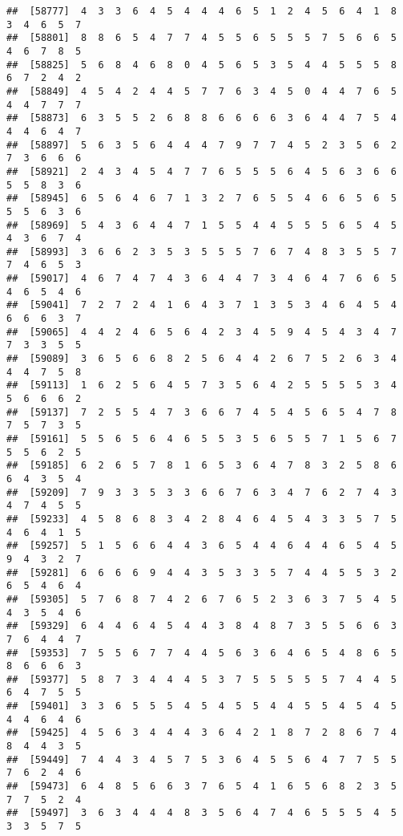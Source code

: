 \documentclass[
]{book}
\begin{document}
\begin{verbatim}
##  [58777]  4  3  3  6  4  5  4  4  4  6  5  1  2  4  5  6  4  1  8  3  4  6  5  7
##  [58801]  8  8  6  5  4  7  7  4  5  5  6  5  5  5  7  5  6  6  5  4  6  7  8  5
##  [58825]  5  6  8  4  6  8  0  4  5  6  5  3  5  4  4  5  5  5  8  6  7  2  4  2
##  [58849]  4  5  4  2  4  4  5  7  7  6  3  4  5  0  4  4  7  6  5  4  4  7  7  7
##  [58873]  6  3  5  5  2  6  8  8  6  6  6  6  3  6  4  4  7  5  4  4  4  6  4  7
##  [58897]  5  6  3  5  6  4  4  4  7  9  7  7  4  5  2  3  5  6  2  7  3  6  6  6
##  [58921]  2  4  3  4  5  4  7  7  6  5  5  5  6  4  5  6  3  6  6  5  5  8  3  6
##  [58945]  6  5  6  4  6  7  1  3  2  7  6  5  5  4  6  6  5  6  5  5  5  6  3  6
##  [58969]  5  4  3  6  4  4  7  1  5  5  4  4  5  5  5  6  5  4  5  4  3  6  7  4
##  [58993]  3  6  6  2  3  5  3  5  5  5  7  6  7  4  8  3  5  5  7  7  4  6  5  3
##  [59017]  4  6  7  4  7  4  3  6  4  4  7  3  4  6  4  7  6  6  5  4  6  5  4  6
##  [59041]  7  2  7  2  4  1  6  4  3  7  1  3  5  3  4  6  4  5  4  6  6  6  3  7
##  [59065]  4  4  2  4  6  5  6  4  2  3  4  5  9  4  5  4  3  4  7  7  3  3  5  5
##  [59089]  3  6  5  6  6  8  2  5  6  4  4  2  6  7  5  2  6  3  4  4  4  7  5  8
##  [59113]  1  6  2  5  6  4  5  7  3  5  6  4  2  5  5  5  5  3  4  5  6  6  6  2
##  [59137]  7  2  5  5  4  7  3  6  6  7  4  5  4  5  6  5  4  7  8  7  5  7  3  5
##  [59161]  5  5  6  5  6  4  6  5  5  3  5  6  5  5  7  1  5  6  7  5  5  6  2  5
##  [59185]  6  2  6  5  7  8  1  6  5  3  6  4  7  8  3  2  5  8  6  6  4  3  5  4
##  [59209]  7  9  3  3  5  3  3  6  6  7  6  3  4  7  6  2  7  4  3  4  7  4  5  5
##  [59233]  4  5  8  6  8  3  4  2  8  4  6  4  5  4  3  3  5  7  5  4  6  4  1  5
##  [59257]  5  1  5  6  6  4  4  3  6  5  4  4  6  4  4  6  5  4  5  9  4  3  2  7
##  [59281]  6  6  6  6  9  4  4  3  5  3  3  5  7  4  4  5  5  3  2  6  5  4  6  4
##  [59305]  5  7  6  8  7  4  2  6  7  6  5  2  3  6  3  7  5  4  5  4  3  5  4  6
##  [59329]  6  4  4  6  4  5  4  4  3  8  4  8  7  3  5  5  6  6  3  7  6  4  4  7
##  [59353]  7  5  5  6  7  7  4  4  5  6  3  6  4  6  5  4  8  6  5  8  6  6  6  3
##  [59377]  5  8  7  3  4  4  4  5  3  7  5  5  5  5  5  7  4  4  5  6  4  7  5  5
##  [59401]  3  3  6  5  5  5  4  5  4  5  5  4  4  5  5  4  5  4  5  4  4  6  4  6
##  [59425]  4  5  6  3  4  4  4  3  6  4  2  1  8  7  2  8  6  7  4  8  4  4  3  5
##  [59449]  7  4  4  3  4  5  7  5  3  6  4  5  5  6  4  7  7  5  5  7  6  2  4  6
##  [59473]  6  4  8  5  6  6  3  7  6  5  4  1  6  5  6  8  2  3  5  7  7  5  2  4
##  [59497]  3  6  3  4  4  4  8  3  5  6  4  7  4  6  5  5  5  4  5  3  3  5  7  5

\end{verbatim}
\end{document}
